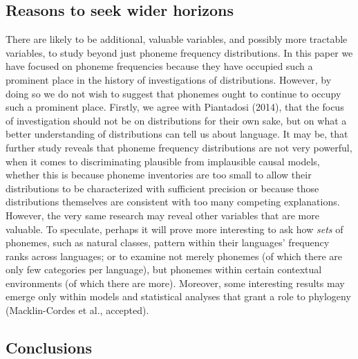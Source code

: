 \hypertarget{reasons-to-seek-wider-horizons}{%
\subsection*{Reasons to seek wider horizons}\label{reasons-to-seek-wider-horizons}}

There are likely to be additional, valuable variables, and possibly more tractable variables, to study beyond just phoneme frequency distributions. In this paper we have focused on phoneme frequencies because they have occupied such a prominent place in the history of investigations of distributions. However, by doing so we do not wish to suggest that phonemes ought to continue to occupy such a prominent place. Firstly, we agree with Piantadosi (2014), that the focus of investigation should not be on distributions for their own sake, but on what a better understanding of distributions can tell us about language. It may be, that further study reveals that phoneme frequency distributions are not very powerful, when it comes to discriminating plausible from implausible causal models, whether this is because phoneme inventories are too small to allow their distributions to be characterized with sufficient precision or because those distributions themselves are consistent with too many competing explanations. However, the very same research may reveal other variables that are more valuable. To speculate, perhaps it will prove more interesting to ask how \emph{sets} of phonemes, such as natural classes, pattern within their languages' frequency ranks across languages; or to examine not merely phonemes (of which there are only few categories per language), but phonemes within certain contextual environments (of which there are more). Moreover, some interesting results may emerge only within models and statistical analyses that grant a role to phylogeny (Macklin-Cordes et al., accepted). \newline

\hypertarget{conclusions}{%
\subsection*{Conclusions}\label{conclusions}}

